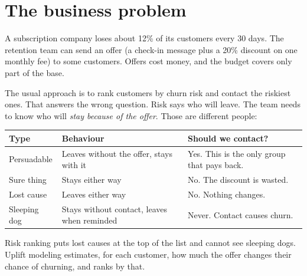 \documentclass[11pt]{article}
\begin{document}
\section{The business problem}
A subscription company loses about 12\% of its customers every 30 days. The retention team can send an offer (a check-in message plus a 20\% discount on one monthly fee) to some customers. Offers cost money, and the budget covers only part of the base.

The usual approach is to rank customers by churn risk and contact the riskiest ones. That answers the wrong question. Risk says who will leave. The team needs to know who will \emph{stay because of the offer}. Those are different people:

\begin{tabularx}{\textwidth}{@{}lLL@{}}
\toprule
Type & Behaviour & Should we contact? \\
\midrule
Persuadable & Leaves without the offer, stays with it & Yes. This is the only group that pays back. \\
Sure thing & Stays either way & No. The discount is wasted. \\
Lost cause & Leaves either way & No. Nothing changes. \\
Sleeping dog & Stays without contact, leaves when reminded & Never. Contact causes churn. \\
\bottomrule
\end{tabularx}

Risk ranking puts lost causes at the top of the list and cannot see sleeping dogs. Uplift modeling estimates, for each customer, how much the offer changes their chance of churning, and ranks by that.
\end{document}
